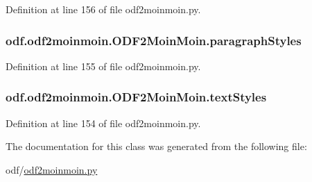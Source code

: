 Definition at line 156 of file odf2moinmoin.\+py.

\hypertarget{classodf_1_1odf2moinmoin_1_1ODF2MoinMoin_aca50f432ad6dfe04dc09ff6f035d3c80}{
\subsubsection[{paragraph\+Styles}]{\setlength{\rightskip}{0pt plus 5cm}odf.\+odf2moinmoin.\+O\+D\+F2\+Moin\+Moin.\+paragraph\+Styles}}\label{classodf_1_1odf2moinmoin_1_1ODF2MoinMoin_aca50f432ad6dfe04dc09ff6f035d3c80}


Definition at line 155 of file odf2moinmoin.\+py.

\hypertarget{classodf_1_1odf2moinmoin_1_1ODF2MoinMoin_ac4e15dda5a28e609b5cabf17c5cf0277}{
\subsubsection[{text\+Styles}]{\setlength{\rightskip}{0pt plus 5cm}odf.\+odf2moinmoin.\+O\+D\+F2\+Moin\+Moin.\+text\+Styles}}\label{classodf_1_1odf2moinmoin_1_1ODF2MoinMoin_ac4e15dda5a28e609b5cabf17c5cf0277}


Definition at line 154 of file odf2moinmoin.\+py.



The documentation for this class was generated from the following file\+:\begin{DoxyCompactItemize}
\item 
odf/\hyperlink{odf2moinmoin_8py}{odf2moinmoin.\+py}\end{DoxyCompactItemize}

